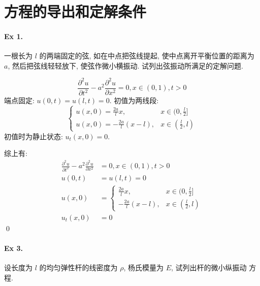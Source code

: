 \section{方程的导出和定解条件}
\paragraph{Ex 1.}
一根长为 $l$ 的两端固定的弦, 如在中点把弦线提起, 使中点离开平衡位置的距离为 $a$,
然后把弦线轻轻放下, 使弦作微小横振动. 试列出弦振动所满足的定解问题.

\begin{solution}
\[
\frac{\partial^2 u}{\partial t^2} - a^2 \frac{\partial^2 u}{\partial x^2} = 0,
x \in (0, 1), t > 0
\]
端点固定: $u(0, t) = u(l, t) = 0$. 初值为两线段:
\[\begin{cases}
u(x, 0) = \frac{2a}{l} x, & x \in (0, \frac{l}{2}] \\
u(x, 0) = -\frac{2a}{l} (x - l), & x \in (\frac{l}{2}, l)
\end{cases} \]
初值时为静止状态: $u_t(x, 0) = 0$.

综上有:
\[ \begin{aligned}
\frac{\partial^2 u}{\partial t^2} - a^2 \frac{\partial^2 u}{\partial x^2} &= 0,
x \in (0, 1), t > 0\\
u(0, t) &= u(l, t) = 0\\
u(x, 0) &= \begin{cases}
\frac{2a}{l} x, & x \in (0, \frac{l}{2}] \\
-\frac{2a}{l} (x - l), & x \in (\frac{l}{2}, l)
\end{cases}\\
u_t(x, 0) &= 0
\end{aligned} \]
\qed
\end{solution}


\paragraph{Ex 3.}
设长度为 $l$ 的均匀弹性杆的线密度为 $\rho$, 杨氏模量为 $E$, 试列出杆的微小纵振动
方程.

